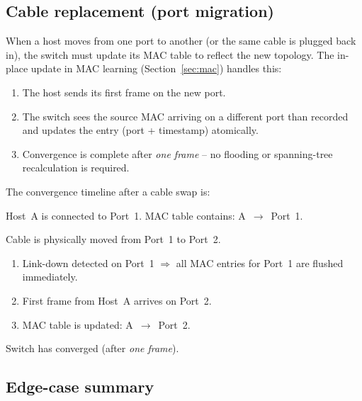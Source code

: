 \documentclass[12pt,a4paper]{article}
\begin{document}
\subsection{Cable replacement (port migration)}

When a host moves from one port to another (or the same cable is plugged back
in), the switch must update its MAC table to reflect the new topology.
The in-place update in MAC learning (Section~\ref{sec:mac}) handles this:

\begin{enumerate}[noitemsep]
  \item The host sends its first frame on the new port.
  \item The switch sees the source MAC arriving on a different port than
    recorded and updates the entry (port + timestamp) atomically.
  \item Convergence is complete after \emph{one frame} -- no flooding or
    spanning-tree recalculation is required.
\end{enumerate}

The convergence timeline after a cable swap is:

\begin{description}[noitemsep]
  \item[$t_0$:] Host~A is connected to Port~1.  MAC table contains:
        A~$\to$~Port~1.
  \item[$t_1$:] Cable is physically moved from Port~1 to Port~2.
    \begin{enumerate}[noitemsep]
      \item Link-down detected on Port~1 $\Rightarrow$ all MAC entries for
            Port~1 are flushed immediately.
      \item First frame from Host~A arrives on Port~2.
      \item MAC table is updated: A~$\to$~Port~2.
    \end{enumerate}
  \item[$t_2$:] Switch has converged (after \emph{one frame}).
\end{description}

\subsection{Edge-case summary}
\end{document}
